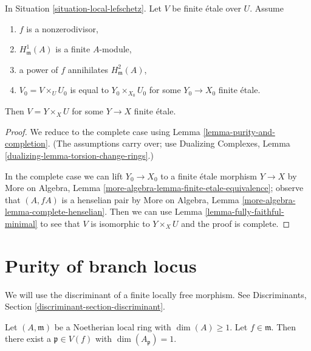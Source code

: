\begin{lemma}
\label{lemma-lift-purity-general}
In Situation \ref{situation-local-lefschetz}.
Let $V$ be finite \'etale over $U$. Assume
\begin{enumerate}
\item $f$ is a nonzerodivisor,
\item $H^1_\mathfrak m(A)$ is a finite $A$-module,
\item a power of $f$ annihilates $H^2_\mathfrak m(A)$,
\item $V_0 = V \times_U U_0$ is equal to $Y_0 \times_{X_0} U_0$
for some $Y_0 \to X_0$ finite \'etale.
\end{enumerate}
Then $V = Y \times_X U$ for some $Y \to X$ finite \'etale.
\end{lemma}

\begin{proof}
We reduce to the complete case using Lemma \ref{lemma-purity-and-completion}.
(The assumptions carry over; use Dualizing Complexes, Lemma
\ref{dualizing-lemma-torsion-change-rings}.)

\medskip\noindent
In the complete case we can lift $Y_0 \to X_0$ to a finite \'etale
morphism $Y \to X$ by
More on Algebra, Lemma \ref{more-algebra-lemma-finite-etale-equivalence};
observe that $(A, fA)$ is a henselian pair by
More on Algebra, Lemma \ref{more-algebra-lemma-complete-henselian}.
Then we can use Lemma \ref{lemma-fully-faithful-minimal}
to see that $V$ is isomorphic to $Y \times_X U$ and
the proof is complete.
\end{proof}










\section{Purity of branch locus}
\label{section-purity}

\noindent
We will use the discriminant of a finite locally free morphism. See
Discriminants, Section \ref{discriminant-section-discriminant}.

\begin{lemma}
\label{lemma-find-point-codim-1}
Let $(A, \mathfrak m)$ be a Noetherian local ring with $\dim(A) \geq 1$.
Let $f \in \mathfrak m$. Then there exist a $\mathfrak p \in V(f)$ with
$\dim(A_\mathfrak p) = 1$.
\end{lemma}

